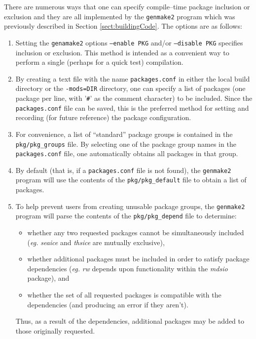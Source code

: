 There are numerous ways that one can specify compile--time package
inclusion or exclusion and they are all implemented by the
\texttt{genmake2} program which was previously described in Section
\ref{sect:buildingCode}.  The options are as follows:
\begin{enumerate}
\item Setting the \texttt{genamake2} options \texttt{--enable PKG}
  and/or \texttt{--disable PKG} specifies inclusion or exclusion.
  This method is intended as a convenient way to perform a single
  (perhaps for a quick test) compilation.
  
\item By creating a text file with the name \texttt{packages.conf} in
  either the local build directory or the \texttt{-mods=DIR}
  directory, one can specify a list of packages (one package per line,
  with '\texttt{\#}' as the comment character) to be included.  Since
  the \texttt{packages.conf} file can be saved, this is the preferred
  method for setting and recording (for future reference) the package
  configuration.
  
\item For convenience, a list of ``standard'' package groups is
  contained in the \texttt{pkg/pkg\_groups} file.  By selecting one of
  the package group names in the \texttt{packages.conf} file, one
  automatically obtains all packages in that group.

\item By default (that is, if a \texttt{packages.conf} file is not
  found), the \texttt{genmake2} program will use the contents of the
  \texttt{pkg/pkg\_default} file to obtain a list of packages.

\item To help prevent users from creating unusable package groups, the
  \texttt{genmake2} program will parse the contents of the
  \texttt{pkg/pkg\_depend} file to determine:
  \begin{itemize}
  \item whether any two requested packages cannot be simultaneously
    included (\textit{eg.} \textit{seaice} and \textit{thsice} are
    mutually exclusive),
  \item whether additional packages must be included in order to
    satisfy package dependencies (\textit{eg.} \textit{rw} depends
    upon functionality within the \textit{mdsio} package), and
  \item whether the set of all requested packages is compatible with
    the dependencies (and producing an error if they aren't).
  \end{itemize}
  Thus, as a result of the dependencies, additional packages may be
  added to those originally requested.

\end{enumerate}


